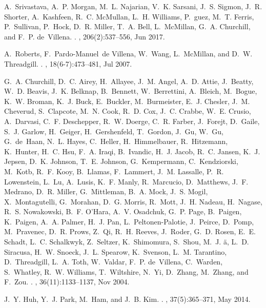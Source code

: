 \documentclass[
]{article}
\begin{document}
\begin{thebibliography}{100}
A.~Srivastava, A.~P. Morgan, M.~L. Najarian, V.~K. Sarsani, J.~S. Sigmon, J.~R.
  Shorter, A.~Kashfeen, R.~C. McMullan, L.~H. Williams, P.~guez, M.~T. Ferris,
  P.~Sullivan, P.~Hock, D.~R. Miller, T.~A. Bell, L.~McMillan, G.~A. Churchill,
  and F.~P. de~Villena.
.
, 206(2):537--556, Jun 2017.

A.~Roberts, F.~Pardo-Manuel~de Villena, W.~Wang, L.~McMillan, and D.~W.
  Threadgill.
.
, 18(6-7):473--481, Jul 2007.

G.~A. Churchill, D.~C. Airey, H.~Allayee, J.~M. Angel, A.~D. Attie, J.~Beatty,
  W.~D. Beavis, J.~K. Belknap, B.~Bennett, W.~Berrettini, A.~Bleich, M.~Bogue,
  K.~W. Broman, K.~J. Buck, E.~Buckler, M.~Burmeister, E.~J. Chesler, J.~M.
  Cheverud, S.~Clapcote, M.~N. Cook, R.~D. Cox, J.~C. Crabbe, W.~E. Crusio,
  A.~Darvasi, C.~F. Deschepper, R.~W. Doerge, C.~R. Farber, J.~Forejt,
  D.~Gaile, S.~J. Garlow, H.~Geiger, H.~Gershenfeld, T.~Gordon, J.~Gu, W.~Gu,
  G.~de~Haan, N.~L. Hayes, C.~Heller, H.~Himmelbauer, R.~Hitzemann, K.~Hunter,
  H.~C. Hsu, F.~A. Iraqi, B.~Ivandic, H.~J. Jacob, R.~C. Jansen, K.~J. Jepsen,
  D.~K. Johnson, T.~E. Johnson, G.~Kempermann, C.~Kendziorski, M.~Kotb, R.~F.
  Kooy, B.~Llamas, F.~Lammert, J.~M. Lassalle, P.~R. Lowenstein, L.~Lu,
  A.~Lusis, K.~F. Manly, R.~Marcucio, D.~Matthews, J.~F. Medrano, D.~R. Miller,
  G.~Mittleman, B.~A. Mock, J.~S. Mogil, X.~Montagutelli, G.~Morahan, D.~G.
  Morris, R.~Mott, J.~H. Nadeau, H.~Nagase, R.~S. Nowakowski, B.~F. O'Hara,
  A.~V. Osadchuk, G.~P. Page, B.~Paigen, K.~Paigen, A.~A. Palmer, H.~J. Pan,
  L.~Peltonen-Palotie, J.~Peirce, D.~Pomp, M.~Pravenec, D.~R. Prows, Z.~Qi,
  R.~H. Reeves, J.~Roder, G.~D. Rosen, E.~E. Schadt, L.~C. Schalkwyk,
  Z.~Seltzer, K.~Shimomura, S.~Shou, M.~J. {\"a}, L.~D. Siracusa, H.~W. Snoeck,
  J.~L. Spearow, K.~Svenson, L.~M. Tarantino, D.~Threadgill, L.~A. Toth,
  W.~Valdar, F.~P. de~Villena, C.~Warden, S.~Whatley, R.~W. Williams,
  T.~Wiltshire, N.~Yi, D.~Zhang, M.~Zhang, and F.~Zou.
.
, 36(11):1133--1137, Nov 2004.

J.~Y. Huh, Y.~J. Park, M.~Ham, and J.~B. Kim.
.
, 37(5):365--371, May 2014.


\end{thebibliography}
\end{document}
